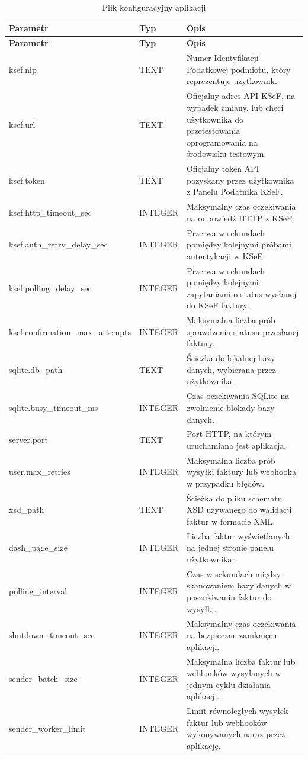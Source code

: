 \begin{small}
\begin{longtable}{>{\raggedright\arraybackslash}p{4.8cm} >{\raggedright\arraybackslash}p{1.7cm} >{\raggedright\arraybackslash}p{6.5cm}}
\caption{Plik konfiguracyjny aplikacji}
\label{tab:config_fields} \\
\toprule
\textbf{Parametr} & \textbf{Typ} & \textbf{Opis} \\
\midrule
\endfirsthead

\toprule
\textbf{Parametr} & \textbf{Typ} & \textbf{Opis} \\
\midrule
\endhead

\bottomrule
\endfoot

ksef.nip & TEXT & Numer Identyfikacji Podatkowej podmiotu, który reprezentuje użytkownik. \\
ksef.url & TEXT & Oficjalny adres API KSeF, na wypadek zmiany, lub chęci użytkownika do przetestowania oprogramowania na środowisku testowym. \\
ksef.token & TEXT & Oficjalny token API pozyskany przez użytkownika z Panelu Podatnika KSeF. \\
ksef.http\_timeout\_sec & INTEGER & Maksymalny czas oczekiwania na odpowiedź HTTP z KSeF. \\
ksef.auth\_retry\_delay\_sec & INTEGER & Przerwa w sekundach pomiędzy kolejnymi próbami autentykacji w KSeF. \\
ksef.polling\_delay\_sec & INTEGER & Przerwa w sekundach pomiędzy kolejnymi zapytaniami o status wysłanej do KSeF faktury. \\
ksef.confirmation\_max\_attempts & INTEGER & Maksymalna liczba prób sprawdzenia statusu przesłanej faktury. \\
sqlite.db\_path & TEXT & Ścieżka do lokalnej bazy danych, wybierana przez użytkownika. \\
sqlite.busy\_timeout\_ms & INTEGER & Czas oczekiwania SQLite na zwolnienie blokady bazy danych. \\
server.port & TEXT & Port HTTP, na którym uruchamiana jest aplikacja. \\
user.max\_retries & INTEGER & Maksymalna liczba prób wysyłki faktury lub webhooka w przypadku błędów. \\
xsd\_path & TEXT & Ścieżka do pliku schematu XSD używanego do walidacji faktur w formacie XML. \\
dash\_page\_size & INTEGER & Liczba faktur wyświetlanych na jednej stronie panelu użytkownika. \\
polling\_interval & INTEGER & Czas w sekundach między skanowaniem bazy danych w poszukiwaniu faktur do wysyłki. \\
shutdown\_timeout\_sec & INTEGER & Maksymalny czas oczekiwania na bezpieczne zamknięcie aplikacji. \\
sender\_batch\_size & INTEGER & Maksymalna liczba faktur lub webhooków wysyłanych w jednym cyklu działania aplikacji. \\
sender\_worker\_limit & INTEGER & Limit równoległych wysyłek faktur lub webhooków wykonywanych naraz przez aplikację. \\
\end{longtable}
\end{small}

